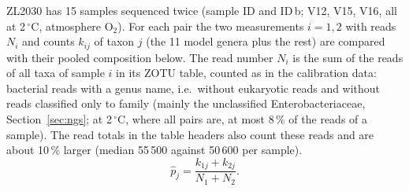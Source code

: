 \documentclass[11pt,a4paper]{article}
\begin{document}
ZL2030 has 15 samples sequenced twice (sample ID and ID\,b; V12, V15, V16, all at 2\,$^\circ$C, atmosphere O$_2$). For each pair the two measurements $i = 1, 2$ with reads $N_i$ and counts $k_{ij}$ of taxon $j$ (the 11 model genera plus the rest) are compared with their pooled composition below. The read number $N_i$ is the sum of the reads of all taxa of sample $i$ in its ZOTU table, counted as in the calibration data: bacterial reads with a genus name, i.e.\ without eukaryotic reads and without reads classified only to family (mainly the unclassified Enterobacteriaceae, Section~\ref{sec:ngs}; at 2\,$^\circ$C, where all pairs are, at most 8\,\% of the reads of a sample). The read totals in the table headers also count these reads and are about 10\,\% larger (median 55\,500 against 50\,600 per sample).
\begin{equation*}
\hat p_j = \frac{k_{1j} + k_{2j}}{N_1 + N_2}.
\end{equation*}
\end{document}
